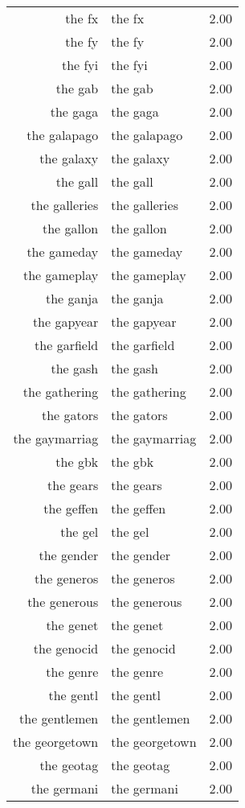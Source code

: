 \begin{table}[ht]
\begin{tabular}{rlr}
  the fx & the fx & 2.00 \\ 
  the fy & the fy & 2.00 \\ 
  the fyi & the fyi & 2.00 \\ 
  the gab & the gab & 2.00 \\ 
  the gaga & the gaga & 2.00 \\ 
  the galapago & the galapago & 2.00 \\ 
  the galaxy & the galaxy & 2.00 \\ 
  the gall & the gall & 2.00 \\ 
  the galleries & the galleries & 2.00 \\ 
  the gallon & the gallon & 2.00 \\ 
  the gameday & the gameday & 2.00 \\ 
  the gameplay & the gameplay & 2.00 \\ 
  the ganja & the ganja & 2.00 \\ 
  the gapyear & the gapyear & 2.00 \\ 
  the garfield & the garfield & 2.00 \\ 
  the gash & the gash & 2.00 \\ 
  the gathering & the gathering & 2.00 \\ 
  the gators & the gators & 2.00 \\ 
  the gaymarriag & the gaymarriag & 2.00 \\ 
  the gbk & the gbk & 2.00 \\ 
  the gears & the gears & 2.00 \\ 
  the geffen & the geffen & 2.00 \\ 
  the gel & the gel & 2.00 \\ 
  the gender & the gender & 2.00 \\ 
  the generos & the generos & 2.00 \\ 
  the generous & the generous & 2.00 \\ 
  the genet & the genet & 2.00 \\ 
  the genocid & the genocid & 2.00 \\ 
  the genre & the genre & 2.00 \\ 
  the gentl & the gentl & 2.00 \\ 
  the gentlemen & the gentlemen & 2.00 \\ 
  the georgetown & the georgetown & 2.00 \\ 
  the geotag & the geotag & 2.00 \\ 
  the germani & the germani & 2.00 \\ 

\end{tabular}
\end{table}
